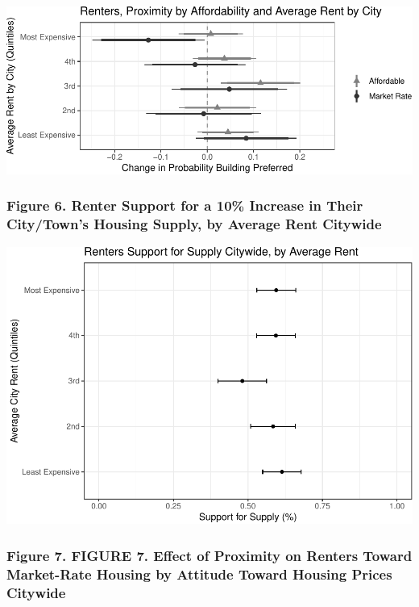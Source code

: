 \documentclass[]{article}
\begin{document}
\includegraphics{Zheng-Ruth-Renters-Paper_files/figure-latex/Print Figure 5-1.pdf}

\hypertarget{figure-6.-renter-support-for-a-10-increase-in-their-citytowns-housing-supply-by-average-rent-citywide}{%
\subsubsection{Figure 6. Renter Support for a 10\% Increase in Their City/Town's Housing Supply, by Average Rent Citywide}\label{figure-6.-renter-support-for-a-10-increase-in-their-citytowns-housing-supply-by-average-rent-citywide}}

\includegraphics{Zheng-Ruth-Renters-Paper_files/figure-latex/Print Figure 6-1.pdf}

\hypertarget{figure-7.-figure-7.-effect-of-proximity-on-renters-toward-market-rate-housing-by-attitude-toward-housing-prices-citywide}{%
\subsubsection{Figure 7. FIGURE 7. Effect of Proximity on Renters Toward Market-Rate Housing by Attitude Toward Housing Prices Citywide}\label{figure-7.-figure-7.-effect-of-proximity-on-renters-toward-market-rate-housing-by-attitude-toward-housing-prices-citywide}}
\end{document}
